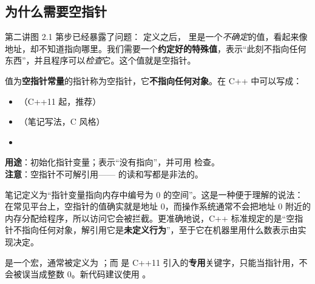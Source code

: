 \subsection{为什么需要空指针}
第二讲图 2.1 第步已经暴露了问题： 定义之后， 里是一个\emph{不确定}的值，看起来像地址，却不知道指向哪里。我们需要一个\textbf{约定好的特殊值}，表示“此刻不指向任何东西”，并且程序可以\emph{检查}它。这个值就是空指针。

\begin{definitionbox}[空指针]
值为\textbf{空指针常量}的指针称为空指针，它\textbf{不指向任何对象}。在 C++ 中可以写成：
\begin{itemize}[itemsep=0pt]
  \item {}\quad （C++11 起，推荐）
  \item {}\quad （笔记写法，C 风格）
  \item {}
\end{itemize}
\textbf{用途}：初始化指针变量；表示“没有指向”，并可用  检查。\\
\textbf{注意}：空指针不可解引用—— 的读和写都是非法的。
\end{definitionbox}

\begin{supplementbox}
笔记定义为“指针变量指向内存中编号为 0 的空间”。这是一种便于理解的说法：在常见平台上，空指针的值确实就是地址 0，而操作系统通常不会把地址 0 附近的内存分配给程序，所以访问它会被拦截。更准确地说，C++ 标准规定的是“空指针不指向任何对象，解引用它是\textbf{未定义行为}”，至于它在机器里用什么数表示由实现决定。

 是一个宏，通常被定义为 ；而  是 C++11 引入的\textbf{专用}关键字，只能当指针用，不会被误当成整数 0。新代码建议使用 。
\end{supplementbox}

